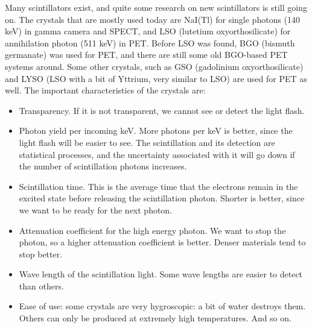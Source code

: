 \documentclass[11pt,oneside]{book}
\begin{document}
Many scintillators exist, and quite some research on new scintillators
is still going on. The crystals that are mostly used today are NaI(Tl)
for single photons (140 keV) in gamma camera and SPECT, and LSO
(lutetium oxyorthosilicate) for annihilation photon (511 keV) in
PET. Before LSO was found, BGO (bismuth germanate) was used for PET,
and there are still some old BGO-based PET systems around. Some other
crystals, such as GSO (gadolinium oxyorthosilicate) and LYSO (LSO with
a bit of Yttrium, very similar to LSO) are used for PET as well. The
important characteristics of the crystals are:
\begin{itemize}
  \item Transparency. If it is not transparent, we cannot see or detect the
        light flash.
  \item Photon yield per incoming keV. More photons per keV is better, since
        the light flash will be easier to see. The scintillation and
        its detection are statistical processes, and the uncertainty
        associated with it will go down if the number of scintillation
        photons increases.
  \item Scintillation time. This is the average time that the electrons
        remain in the excited state before releasing the scintillation
        photon. Shorter is better, since we want to be ready for the next
        photon.
  \item Attenuation coefficient for the high energy photon. We want to stop
        the photon, so a higher attenuation coefficient is better. Denser
        materials tend to stop better.
  \item Wave length of the scintillation light. Some wave lengths are easier
        to detect than others.
  \item Ease of use: some crystals are very hygroscopic: a bit of water
        destroys them. Others can only be produced at extremely high
        temperatures. And so on.
\end{itemize}
\end{document}
